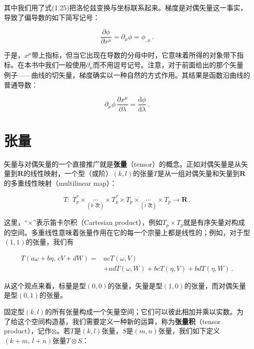 其中我们用了式(1.25)把洛伦兹变换与坐标联系起来。梯度是对偶矢量这一事实，导致了偏导数的如下简写记号：

\begin{equation*}
\frac{\partial\phi}{\partial x^{\mu}}=\partial_{\mu}\phi=\phi_{,\mu}\,.
\tag{1.54}
\end{equation*}

于是，$x^{\mu}$带上指标，但当它出现在导数的分母中时，它意味着所得的对象带下指标。在本书中我们一般使用$\partial_{\mu}$而不用逗号记号。注意，对于前面给出的那个矢量例子——曲线的切矢量，梯度确实以一种自然的方式作用。其结果是函数沿曲线的普通导数：

\begin{equation*}
\partial_{\mu}\phi\,\frac{\partial x^{\mu}}{\partial\lambda}=\frac{\mathrm{d}\phi}{\mathrm{d}\lambda}\,.
\tag{1.55}
\end{equation*}

\section{张量}

矢量与对偶矢量的一个直接推广就是\textbf{张量}（tensor）的概念。正如对偶矢量是从矢量到$\mathbf{R}$的线性映射，一个型（或阶）$(k,l)$的张量$T$是从一组对偶矢量和矢量到$\mathbf{R}$的多重线性映射（multilinear map）：

\begin{equation*}
T:\;T_p^{*}\times\underset{(k\text{ 次})}{\cdots}\times T_p^{*}
\times T_p\times\underset{(l\text{ 次})}{\cdots}\times T_p\rightarrow\mathbf{R}\,.
\tag{1.56}
\end{equation*}

这里，“$\times$”表示笛卡尔积（Cartesian product），例如$T_p\times T_p$就是有序矢量对构成的空间。多重线性意味着张量作用在它的每一个宗量上都是线性的；例如，对于型$(1,1)$的张量，我们有

\begin{align*}
T(a\omega+b\eta,\,cV+dW)={}&acT(\omega,V)\\
&+adT(\omega,W)+bcT(\eta,V)+bdT(\eta,W)\,.
\tag{1.57}
\end{align*}

从这个观点来看，标量是型$(0,0)$的张量，矢量是型$(1,0)$的张量，而对偶矢量是型$(0,1)$的张量。

固定型$(k,l)$的所有张量构成一个矢量空间；它们可以彼此相加并乘以实数。为了给这个空间构造基，我们需要定义一种新的运算，称为\textbf{张量积}（tensor product），记作$\otimes$。若$T$是$(k,l)$张量，$S$是$(m,n)$张量，我们如下定义$(k+m,\,l+n)$张量$T\otimes S$：

